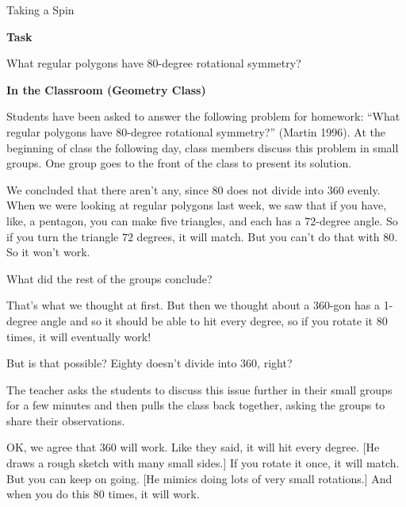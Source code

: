 \TriExample
  {
    Taking a Spin
  }
  {
    \textbf{Task}

    What regular polygons have 80-degree rotational symmetry?

    \textbf{In the Classroom (Geometry Class)}

    Students have been asked to answer the following problem for homework: ``What regular polygons have 80-degree rotational symmetry?'' (Martin 1996). At the beginning of class the following day, class members discuss this problem in small groups. One group goes to the front of the class to present its solution.

    \begin{scriptlist}
      \item [Student 1:] We concluded that there aren't any, since $80$ does not divide into $360$ evenly. When we were looking at regular polygons last week, we saw that if you have, like, a pentagon, you can make five triangles, and each has a 72-degree angle. So if you turn the triangle $72$ degrees, it will match. But you can't do that with $80$. So it won't work.\vspace{2\baselineskip}
      
      \item [Teacher:] What did the rest of the groups conclude?
      
      \item [Student 2:] That's what we thought at first. But then we thought about a 360-gon has a 1-degree angle and so it should be able to hit every degree, so if you rotate it $80$ times, it will eventually work!
      
      \item [Student 1:] But is that possible? Eighty doesn't divide into $360$, right?
    \end{scriptlist}\vspace{\baselineskip}

    The teacher asks the students to discuss this issue further in their small groups for a few minutes and then pulls the class back together, asking the groups to share their observations.

    \begin{scriptlist}
      \item [Student 3:] OK, we agree that $360$ will work. Like they said, it will hit every degree. [He draws a rough sketch with many small sides.] If you rotate it once, it will match. But you can keep on going. [He mimics doing lots of very small rotations.] And when you do this $80$ times, it will work.\vspace{2\baselineskip}
      

\end{scriptlist}}
